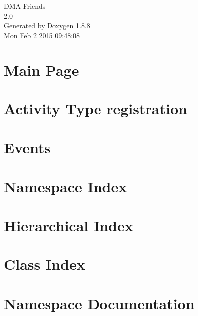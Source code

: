 \documentclass[twoside]{book}
\newcommand{\+}{\discretionary{\mbox{\scriptsize$\hookleftarrow$}}{}{}}
\newcommand{\clearemptydoublepage}{%
  \newpage{\pagestyle{empty}\cleardoublepage}%
}
\begin{document}
\hypersetup{pageanchor=false,
             bookmarks=true,
             bookmarksnumbered=true,
             pdfencoding=unicode
            }
\begin{titlepage}
\vspace*{7cm}
\begin{center}%
{\Large D\+M\+A Friends \\[1ex]\large 2.\+0 }\\
\vspace*{1cm}
{\large Generated by Doxygen 1.8.8}\\
\vspace*{0.5cm}
{\small Mon Feb 2 2015 09:48:08}\\
\end{center}
\end{titlepage}
\clearemptydoublepage
\tableofcontents
\clearemptydoublepage
{}
\hypersetup{pageanchor=true}

\chapter{Main Page}
\label{index}\hypertarget{index}{}
\chapter{Activity Type registration}
\label{df/d06/md_docs_ACTIVITY-TYPES}
\hypertarget{df/d06/md_docs_ACTIVITY-TYPES}{}

\chapter{Events}
\label{df/d0e/md_docs_EVENTS}
\hypertarget{df/d0e/md_docs_EVENTS}{}

\chapter{Namespace Index}

\chapter{Hierarchical Index}

\chapter{Class Index}

\chapter{Namespace Documentation}




\end{document}
